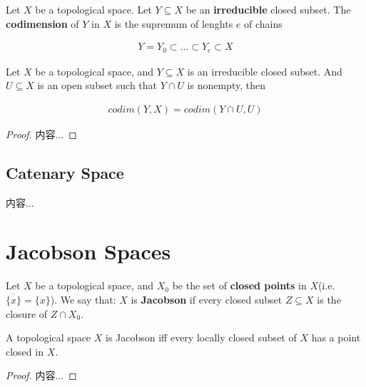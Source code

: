 \documentclass[Total.tex]{subfiles}
\begin{document}
				\begin{Def}
					Let $X$ be a topological space. Let $Y\subseteq X$ be an \textbf{irreducible} closed subset. The \textbf{codimension} of $Y$ in $X$ is the supremum of lenghts $e$ of chains
					
					\begin{gather*}
						Y=Y_0\subset \dots\subset Y_e\subset X
					\end{gather*}
				\end{Def}
				
				\begin{lemma}
					Let $X$ be a topological space, and $Y\subseteq X$ is an irreducible closed subset. And $U\subseteq X$ is an open subset such that $Y\cap U$ is nonempty, then
					
					\begin{gather*}
						codim(Y,X)=codim(Y\cap U,U)
					\end{gather*}
				\end{lemma}
				
				\begin{proof}
					内容...
				\end{proof}
			\subsection{Catenary Space}
			
				\begin{Def}
					内容...
				\end{Def}
		\section{Jacobson Spaces}
			
			\begin{Def}
				Let $X$ be a topological space, and $X_0$ be the set of \textbf{closed points} in $X$(i.e. $\overline{\{x\}}=\{x\}$). We say that: $X$ is \textbf{Jacobson} if every closed subset $Z\subseteq X$ is the closure of $Z\cap X_0$. 
				
			
			\end{Def}
			
				\begin{lemma}
				A topological space $X$ is Jacobson iff every locally closed subset of $X$ has a point closed in $X$.
			\end{lemma}
			
			\begin{proof}
				内容...
			\end{proof}
			
\end{document}
